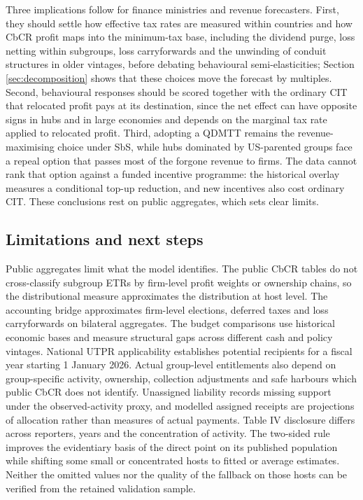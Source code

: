 \documentclass[11pt,a4paper]{article}
\begin{document}
Three implications follow for finance ministries and revenue forecasters. First, they should settle how effective tax rates are measured within countries and how CbCR profit maps into the minimum-tax base, including the dividend purge, loss netting within subgroups, loss carryforwards and the unwinding of conduit structures in older vintages, before debating behavioural semi-elasticities; Section \ref{sec:decomposition} shows that these choices move the forecast by multiples. Second, behavioural responses should be scored together with the ordinary CIT that relocated profit pays at its destination, since the net effect can have opposite signs in hubs and in large economies and depends on the marginal tax rate applied to relocated profit. Third, adopting a QDMTT remains the revenue-maximising choice under SbS, while hubs dominated by US-parented groups face a repeal option that passes most of the forgone revenue to firms. The data cannot rank that option against a funded incentive programme: the historical overlay measures a conditional top-up reduction, and new incentives also cost ordinary CIT. These conclusions rest on public aggregates, which sets clear limits.

\subsection{Limitations and next steps}\label{sec:limitations}

Public aggregates limit what the model identifies. The public CbCR tables do not cross-classify subgroup ETRs by firm-level profit weights or ownership chains, so the distributional measure approximates the distribution at host level. The accounting bridge approximates firm-level elections, deferred taxes and loss carryforwards on bilateral aggregates. The budget comparisons use historical economic bases and measure structural gaps across different cash and policy vintages. National UTPR applicability establishes potential recipients for a fiscal year starting 1 January 2026. Actual group-level entitlements also depend on group-specific activity, ownership, collection adjustments and safe harbours which public CbCR does not identify. Unassigned liability records missing support under the observed-activity proxy, and modelled assigned receipts are projections of allocation rather than measures of actual payments. Table IV disclosure differs across reporters, years and the concentration of activity. The two-sided rule improves the evidentiary basis of the direct point on its published population while shifting some small or concentrated hosts to fitted or average estimates. Neither the omitted values nor the quality of the fallback on those hosts can be verified from the retained validation sample.
\end{document}
